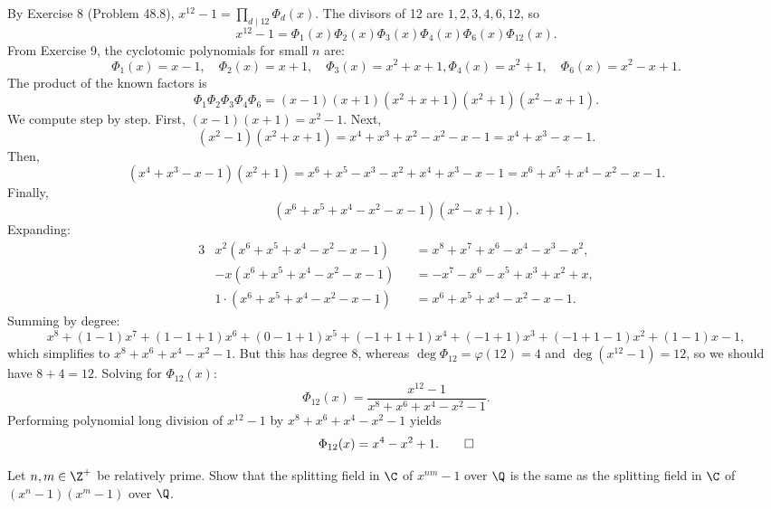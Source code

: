 \begin{solution}
  By Exercise 8 (Problem 48.8), $x^{12} - 1 = \prod_{d \mid 12} \Phi_d(x)$. The divisors of 12 are $1, 2, 3, 4, 6, 12$, so
  \[%
    x^{12} - 1 = \Phi_1(x)\Phi_2(x)\Phi_3(x)\Phi_4(x)\Phi_6(x)\Phi_{12}(x)
  .\]%
  From Exercise 9, the cyclotomic polynomials for small $n$ are:
  \[%
    \Phi_1(x) = x - 1, \quad \Phi_2(x) = x + 1, \quad \Phi_3(x) = x^2 + x + 1, \Phi_4(x) = x^2 + 1, \quad \Phi_6(x) = x^2 - x + 1
  .\]%
  The product of the known factors is
  \[%
    \Phi_1\Phi_2\Phi_3\Phi_4\Phi_6 = (x-1)(x+1)(x^2+x+1)(x^2+1)(x^2-x+1)
  .\]%
  We compute step by step. First, $(x-1)(x+1) = x^2 - 1$. Next,
  \[%
    (x^2-1)(x^2+x+1) = x^4 + x^3 + x^2 - x^2 - x - 1 = x^4 + x^3 - x - 1
  .\]%
  Then,
  \[%
    (x^4 + x^3 - x - 1)(x^2 + 1) = x^6 + x^5 - x^3 - x^2 + x^4 + x^3 - x - 1 = x^6 + x^5 + x^4 - x^2 - x - 1
  .\]%
  Finally,
  \[%
    (x^6 + x^5 + x^4 - x^2 - x - 1)(x^2 - x + 1)
  .\]%
  Expanding:
  \begin{alignat*}{3}
    &x^2(x^6 + x^5 + x^4 - x^2 - x - 1) &&= x^8 + x^7 + x^6 - x^4 - x^3 - x^2, \\
    &{-x}(x^6 + x^5 + x^4 - x^2 - x - 1) &&= -x^7 - x^6 - x^5 + x^3 + x^2 + x, \\
    &1 \cdot (x^6 + x^5 + x^4 - x^2 - x - 1) &&= x^6 + x^5 + x^4 - x^2 - x - 1
  .\end{alignat*}
  Summing by degree:
  \[%
    x^8 + (1-1)x^7 + (1-1+1)x^6 + (0-1+1)x^5 + (-1+1+1)x^4 + (-1+1)x^3 + (-1+1-1)x^2 + (1-1)x - 1
  ,\]%
  which simplifies to $x^8 + x^6 + x^4 - x^2 - 1$. But this has degree 8, whereas $\deg\Phi_{12} = \varphi(12) = 4$ and $\deg(x^{12}-1) = 12$, so we should have $8 + 4 = 12$. Solving for $\Phi_{12}(x)$:
  \[%
    \Phi_{12}(x) = \frac{x^{12}-1}{x^8 + x^6 + x^4 - x^2 - 1}
  .\]%
  Performing polynomial long division of $x^{12} - 1$ by $x^8 + x^6 + x^4 - x^2 - 1$ yields
  \[%
    \Phi_{12}(x) = x^4 - x^2 + 1
  .\qedhere\]%
\end{solution}

\begin{problem}[48.12]
  Let $n, m \in \Z^+$ be relatively prime. Show that the splitting field in $\C$ of $x^{nm} - 1$ over $\Q$ is the same as the splitting field in $\C$ of $(x^n - 1)(x^m - 1)$ over $\Q$.
\end{problem}

